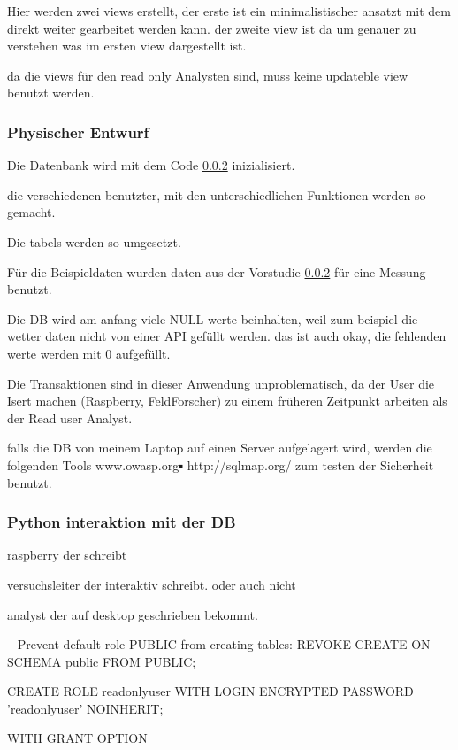 Hier werden zwei views erstellt, der erste ist ein minimalistischer ansatzt mit dem direkt  weiter gearbeitet werden kann. der zweite view ist da um genauer zu verstehen was im ersten view dargestellt ist.

da die views für den read only Analysten sind, muss keine updateble view benutzt werden.

\subsubsection{Physischer Entwurf}
Die Datenbank wird mit dem Code \ref{} inizialisiert.

die verschiedenen benutzter, mit den unterschiedlichen Funktionen werden so gemacht.

Die tabels werden so umgesetzt.

Für die Beispieldaten wurden daten aus der Vorstudie \ref{} für eine Messung benutzt.

Die DB wird am anfang viele NULL werte beinhalten, weil zum beispiel die wetter daten nicht von einer API gefüllt werden. das ist auch okay, die fehlenden werte werden mit 0  aufgefüllt.

Die Transaktionen sind in dieser Anwendung unproblematisch, da der User die Isert machen (Raspberry, FeldForscher) zu einem früheren Zeitpunkt arbeiten als der Read user Analyst.

falls die DB von meinem Laptop auf einen Server aufgelagert wird, werden die folgenden Tools www.owasp.org▪ http://sqlmap.org/ zum testen der Sicherheit benutzt.

\subsubsection{Python interaktion mit der DB}
raspberry der schreibt

versuchsleiter der interaktiv schreibt. oder auch nicht

analyst der auf desktop geschrieben bekommt.


-- Prevent default role PUBLIC from creating tables:
REVOKE CREATE ON SCHEMA public FROM PUBLIC;

CREATE ROLE readonlyuser WITH LOGIN ENCRYPTED PASSWORD 'readonlyuser' NOINHERIT;

WITH GRANT OPTION
